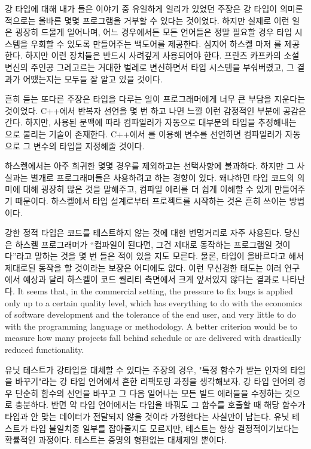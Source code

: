 강 타입에 대해 내가 들은 이야기 중 유일하게 일리가 있었던 주장은 강 타입이 의미론적으로는 올바른 몇몇 프로그램을 거부할 수 있다는 것이었다.
하지만 실제로 이런 일은 굉장히 드물게 일어나며, 어느 경우에서든 모든 언어들은 정말 필요할 경우 타입 시스템을 우회할 수 있도록 만들어주는 백도어를 제공한다.
심지어 하스켈 마저 를 제공한다. 하지만 이런 장치들은 반드시 사려깊게 사용되어야 한다.
프란츠 카프카의 소설 변신의 주인공 그레고르는 거대한 벌레로 변신하면서 타입 시스템을 부숴버렸고, 그 결과가 어땠는지는 모두들 잘 알고 있을 것이다.

흔히 듣는 또다른 주장은 타입을 다루는 일이 프로그래머에게 너무 큰 부담을 지운다는 것이었다. 
C++에서 반복자 선언을 몇 번 하고 나면 느낄 이런 감정적인 부분에 공감은 간다.
하지만, 사용된 문맥에 따라 컴파일러가 자동으로 대부분의 타입을 추정해내는 \newterm{\trTypeInference}으로 불리는 기술이 존재한다.
C++에서 를 이용해 변수를 선언하면 컴파일러가 자동으로 그 변수의 타입을 지정해줄 것이다.

하스켈에서는 아주 희귀한 몇몇 경우를 제외하고는 \trTypeAnnotation\은 선택사항에 불과하다.
하지만 그 사실과는 별개로 프로그래머들은 \trTypeAnnotation\을 사용하려고 하는 경향이 있다.
왜냐하면 타입 \trAnnotation\은 코드의 의미에 대해 굉장히 많은 것을 말해주고, 컴파일 에러를 더 쉽게 이해할 수 있게 만들어주기 때문이다.
하스켈에서 타입 설계로부터 프로젝트를 시작하는 것은 흔히 쓰이는 방법이다. 

강한 정적 타입은 코드를 테스트하지 않는 것에 대한 변명거리로 자주 사용된다.
당신은 하스켈 프로그래머가 ``컴파일이 된다면, 그건 제대로 동작하는 프로그램일 것이다''라고 말하는 것을 몇 번 들은 적이 있을 지도 모른다.
물론, 타입이 올바르다고 해서 제대로된 동작을 할 것이라는 보장은 어디에도 없다.
이런 무신경한 태도는 여러 연구에서 예상과 달리 하스켈이 코드 퀄리티 측면에서 크게 앞서있지 않다는 결과로 나타난다.
It seems that, in the commercial setting, the pressure to
fix bugs is applied only up to a certain quality level, which has
everything to do with the economics of software development and the
tolerance of the end user, and very little to do with the programming
language or methodology. A better criterion would be to measure how many
projects fall behind schedule or are delivered with drastically reduced
functionality.

유닛 테스트가 강타입을 대체할 수 있다는 주장의 경우, "특정 함수가 받는 인자의 타입을 바꾸기"라는 강 타입 언어에서 흔한 리팩토링 과정을 생각해보자.
강 타입 언어의 경우 단순히 함수의 선언을 바꾸고 그 다음 일어나는 모든 빌드 에러들을 수정하는 것으로 충분하다.
반면 약 타입 언어에서는 타입을 바꿔도 그 함수를 호출할 때 해당 함수가 타입과 안 맞는 데이터가 전달되지 않을 것이라 가정한다는 사실만이 남는다.
유닛 테스트가 타입 불일치중 일부를 잡아줄지도 모르지만, 테스트는 항상 결정적이기보다는 확률적인 과정이다. 테스트는 증명의 형편없는 대체제일 뿐이다.


